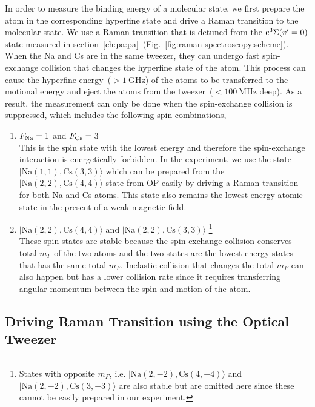 In order to measure the binding energy of a molecular state,
we first prepare the atom in the corresponding hyperfine state
and drive a Raman transition to the molecular state.
We use a Raman transition that is detuned from
the $\mathrm{c^3\Sigma}{\left({v'=0}\right)}$ state
measured in section~\ref{ch:pa:pa}~(Fig.~\ref{fig:raman-spectroscopy:scheme}).
When the Na and Cs are in the same tweezer,
they can undergo fast spin-exchange collision that changes the hyperfine state of the atom.
This process can cause the hyperfine energy~($>1~\mathrm{GHz}$) of the atoms
to be transferred to the motional energy
and eject the atoms from the tweezer~($<100~\mathrm{MHz}$ deep).
As a result, the measurement can only be done when the spin-exchange collision is suppressed,
which includes the following spin combinations,
\begin{enumerate}
\item $F_{\mathrm{Na}}=1$ and $F_{\mathrm{Cs}}=3$\\
  This is the spin state with the lowest energy and therefore the spin-exchange interaction
  is energetically forbidden.
  In the experiment, we use the state $|\mathrm{Na(1, 1),Cs(3, 3)}\rangle$
  which can be prepared from the $|\mathrm{Na(2, 2),Cs(4, 4)}\rangle$ state from OP
  easily by driving a Raman transition for both Na and Cs atoms.
  This state also remains the lowest energy atomic state in the present of a weak magnetic field.
\item $|\mathrm{Na(2, 2),Cs(4, 4)}\rangle$ and $|\mathrm{Na(2, 2),Cs(3, 3)}\rangle$
  \footnote{States with opposite $m_F$, i.e.
    $|\mathrm{Na(2, -2),Cs(4, -4)}\rangle$ and $|\mathrm{Na(2, -2),Cs(3, -3)}\rangle$ are also stable
    but are omitted here since these cannot be easily prepared in our experiment.}\\
  These spin states are stable because the spin-exchange collision conserves total $m_F$
  of the two atoms and
  the two states are the lowest energy states that has the same total $m_F$.
  Inelastic collision that changes the total $m_F$ can also happen
  but has a lower collision rate since it requires transferring angular momentum
  between the spin and motion of the atom.
\end{enumerate}

\subsection{Driving Raman Transition using the Optical Tweezer}
\label{ch:raman-spectroscopy:states:raman-tweezer}

